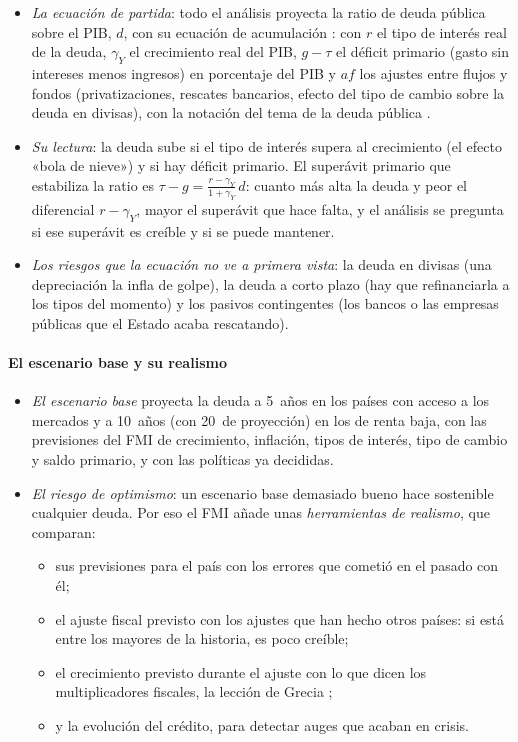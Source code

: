 \documentclass[11pt]{article}
\begin{document}
\begin{itemize}
\item \emph{La ecuación de partida}: todo el análisis proyecta la ratio de deuda pública sobre el PIB, $d$, con su ecuación de acumulación :
  con $r$ el tipo de interés real de la deuda, $\gamma_Y$ el crecimiento real del PIB, $g-\tau$ el déficit primario (gasto sin intereses menos ingresos) en porcentaje del PIB y $af$ los ajustes entre flujos y fondos (privatizaciones, rescates bancarios, efecto del tipo de cambio sobre la deuda en divisas), con la notación del tema de la deuda pública .
\item \emph{Su lectura}: la deuda sube si el tipo de interés supera al crecimiento (el efecto «bola de nieve») y si hay déficit primario. El superávit primario que estabiliza la ratio es $\tau-g=\frac{r-\gamma_Y}{1+\gamma_Y}\,d$: cuanto más alta la deuda y peor el diferencial $r-\gamma_Y$, mayor el superávit que hace falta, y el análisis se pregunta si ese superávit es creíble y si se puede mantener.
\item \emph{Los riesgos que la ecuación no ve a primera vista}: la deuda en divisas (una depreciación la infla de golpe), la deuda a corto plazo (hay que refinanciarla a los tipos del momento) y los pasivos contingentes (los bancos o las empresas públicas que el Estado acaba rescatando).
\end{itemize}

\paragraph{El escenario base y su realismo}

\begin{itemize}
\item \emph{El escenario base} proyecta la deuda a 5~años en los países con acceso a los mercados y a 10~años (con 20~de proyección) en los de renta baja, con las previsiones del FMI de crecimiento, inflación, tipos de interés, tipo de cambio y saldo primario, y con las políticas ya decididas.
\item \emph{El riesgo de optimismo}: un escenario base demasiado bueno hace sostenible cualquier deuda. Por eso el FMI añade unas \emph{herramientas de realismo}, que comparan:
  \begin{itemize}
  \item sus previsiones para el país con los errores que cometió en el pasado con él;
  \item el ajuste fiscal previsto con los ajustes que han hecho otros países: si está entre los mayores de la historia, es poco creíble;
  \item el crecimiento previsto durante el ajuste con lo que dicen los multiplicadores fiscales, la lección de Grecia ;
  \item y la evolución del crédito, para detectar auges que acaban en crisis.
  \end{itemize}
\end{itemize}
\end{document}
